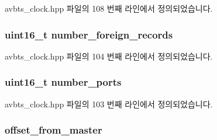 avbts\+\_\+clock.\+hpp 파일의 108 번째 라인에서 정의되었습니다.

\subsubsection[{\texorpdfstring{number\+\_\+foreign\+\_\+records}{number_foreign_records}}]{\setlength{\rightskip}{0pt plus 5cm}uint16\+\_\+t number\+\_\+foreign\+\_\+records\hspace{0.3cm}{\ttfamily [private]}}\hypertarget{class_i_e_e_e1588_clock_acd14be310d9887f8738ed0e47589bbb7}{}\label{class_i_e_e_e1588_clock_acd14be310d9887f8738ed0e47589bbb7}


avbts\+\_\+clock.\+hpp 파일의 104 번째 라인에서 정의되었습니다.

\subsubsection[{\texorpdfstring{number\+\_\+ports}{number_ports}}]{\setlength{\rightskip}{0pt plus 5cm}uint16\+\_\+t number\+\_\+ports\hspace{0.3cm}{\ttfamily [private]}}\hypertarget{class_i_e_e_e1588_clock_a4d6442f37a5e72ab47510123acc202b5}{}\label{class_i_e_e_e1588_clock_a4d6442f37a5e72ab47510123acc202b5}


avbts\+\_\+clock.\+hpp 파일의 103 번째 라인에서 정의되었습니다.

\subsubsection[{\texorpdfstring{offset\+\_\+from\+\_\+master}{offset_from_master}}]{ offset\+\_\+from\+\_\+master\hspace{0.3cm}{\ttfamily [private]}}\hypertarget{class_i_e_e_e1588_clock_ab5f283114581e578de7b7bc9b016e3b6}{}\label{class_i_e_e_e1588_clock_ab5f283114581e578de7b7bc9b016e3b6}



